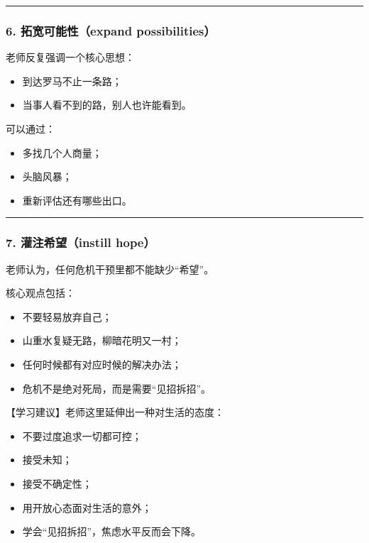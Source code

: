 \documentclass[
  chinese,
  9pt,
  a4paper,
]{ctexart}
\providecommand{\tightlist}{%
  \setlength{\itemsep}{0pt}\setlength{\parskip}{0pt}}
\begin{document}
\begin{center}\rule{0.5\linewidth}{0.5pt}\end{center}

\subsubsection{6. 拓宽可能性（expand
possibilities）}\label{ux62d3ux5bbdux53efux80fdux6027expand-possibilities}

老师反复强调一个核心思想：

\begin{itemize}
\tightlist
\item
  到达罗马不止一条路；
\item
  当事人看不到的路，别人也许能看到。
\end{itemize}

可以通过：

\begin{itemize}
\tightlist
\item
  多找几个人商量；
\item
  头脑风暴；
\item
  重新评估还有哪些出口。
\end{itemize}

\begin{center}\rule{0.5\linewidth}{0.5pt}\end{center}

\subsubsection{7. 灌注希望（instill
hope）}\label{ux704cux6ce8ux5e0cux671binstill-hope}

老师认为，任何危机干预里都不能缺少``希望''。

核心观点包括：

\begin{itemize}
\tightlist
\item
  不要轻易放弃自己；
\item
  山重水复疑无路，柳暗花明又一村；
\item
  任何时候都有对应时候的解决办法；
\item
  危机不是绝对死局，而是需要``见招拆招''。
\end{itemize}

【学习建议】老师这里延伸出一种对生活的态度：

\begin{itemize}
\tightlist
\item
  不要过度追求一切都可控；
\item
  接受未知；
\item
  接受不确定性；
\item
  用开放心态面对生活的意外；
\item
  学会``见招拆招''，焦虑水平反而会下降。
\end{itemize}
\end{document}
